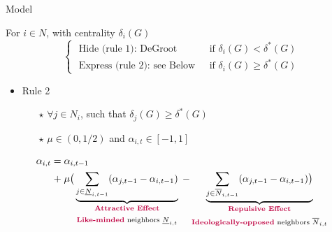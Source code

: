 \documentclass[xcolor=table,handout]{beamer}
\begin{document}
\begin{frame}{Model}
		
				\begin{tcolorbox}[enhanced,attach boxed title to top center={yshift=-3mm,yshifttext=-1mm}, colback=red!3,colframe=red!40,colbacktitle=red!40 ,fonttitle=\bfseries, boxed title style={size=small,colframe=red!50}, title ={Opinion Updating} ]  For $i \in N$, with centrality $\delta_i (G)$
\begin{equation*} 
	\begin{cases}
		 \text{ Hide (rule 1): DeGroot } & \text{ if } \delta_i (G) < \delta^{*} (G) \\
		\text{ Express (rule 2): see Below } & \text{ if } \delta_i (G) \geq \delta^{*} (G)
	\end{cases}
\end{equation*} 
	\end{tcolorbox}
	
	\begin{itemize}
		\item Rule 2 \begin{itemize} \item[$\star$] $\forall j \in N_i$, such that $ \delta_j(G) \geq \delta^{*} (G)$ \item[$\star$] {$\mu \in (0,1/2)$} and {\bf\color{purple}$\alpha_{i,t} \in [-1,1]$} \end{itemize} 
	\end{itemize}
 	\begin{equation*}
	\begin{split}
	 \alpha_{i,{t}}  =  & \; \alpha_{i,{t-1}} \\  +   & \; \mu \big( \underbrace{\sum_{j \in \underline{N}_{i,t-1}}   (  \alpha_{j,t-1} - \alpha_{i,t-1} )}_{\substack{\text{{\bf\color{purple}Attractive Effect}} \\ \\ \text{{\bf\color{purple}Like-minded} neighbors } \underline{N}_{i,t}}} \; - \underbrace{\sum_{j \in \overline{N}_{i,t-1}} ( \alpha_{j,t-1} - \alpha_{i,t-1} ) \big)}_{\substack{\text{{\bf\color{purple}Repulsive Effect}} \\ \\ \text{{\bf\color{purple}Ideologically-opposed} neighbors } \overline{N}_{i,t}}}    \label{lawofmotion}
	 \end{split}
 	\end{equation*}



\end{frame}
\end{document}
